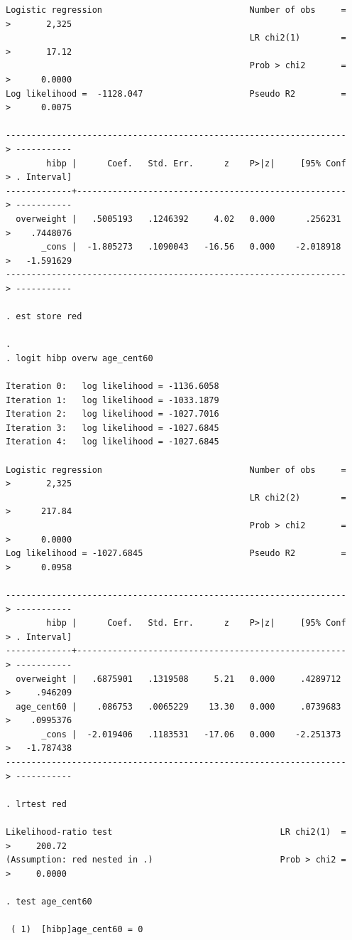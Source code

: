 \documentclass{article}
\begin{document}
\begin{enumerate}[a.]
\begin{verbatim}
Logistic regression                             Number of obs     =
>       2,325
                                                LR chi2(1)        =
>       17.12
                                                Prob > chi2       =
>      0.0000
Log likelihood =  -1128.047                     Pseudo R2         =
>      0.0075

-------------------------------------------------------------------
> -----------
        hibp |      Coef.   Std. Err.      z    P>|z|     [95% Conf
> . Interval]
-------------+-----------------------------------------------------
> -----------
  overweight |   .5005193   .1246392     4.02   0.000      .256231 
>    .7448076
       _cons |  -1.805273   .1090043   -16.56   0.000    -2.018918 
>   -1.591629
-------------------------------------------------------------------
> -----------

. est store red

. 
. logit hibp overw age_cent60

Iteration 0:   log likelihood = -1136.6058  
Iteration 1:   log likelihood = -1033.1879  
Iteration 2:   log likelihood = -1027.7016  
Iteration 3:   log likelihood = -1027.6845  
Iteration 4:   log likelihood = -1027.6845  

Logistic regression                             Number of obs     =
>       2,325
                                                LR chi2(2)        =
>      217.84
                                                Prob > chi2       =
>      0.0000
Log likelihood = -1027.6845                     Pseudo R2         =
>      0.0958

-------------------------------------------------------------------
> -----------
        hibp |      Coef.   Std. Err.      z    P>|z|     [95% Conf
> . Interval]
-------------+-----------------------------------------------------
> -----------
  overweight |   .6875901   .1319508     5.21   0.000     .4289712 
>     .946209
  age_cent60 |    .086753   .0065229    13.30   0.000     .0739683 
>    .0995376
       _cons |  -2.019406   .1183531   -17.06   0.000    -2.251373 
>   -1.787438
-------------------------------------------------------------------
> -----------

. lrtest red

Likelihood-ratio test                                 LR chi2(1)  =
>     200.72
(Assumption: red nested in .)                         Prob > chi2 =
>     0.0000

. test age_cent60

 ( 1)  [hibp]age_cent60 = 0


\end{verbatim}
\end{enumerate}
\end{document}
